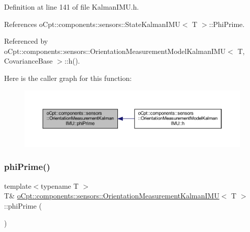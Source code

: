 Definition at line 141 of file Kalman\+I\+M\+U.\+h.



References o\+Cpt\+::components\+::sensors\+::\+State\+Kalman\+I\+M\+U$<$ T $>$\+::\+Phi\+Prime.



Referenced by o\+Cpt\+::components\+::sensors\+::\+Orientation\+Measurement\+Model\+Kalman\+I\+M\+U$<$ T, Covariance\+Base $>$\+::h().

Here is the caller graph for this function\+:
\nopagebreak
\begin{figure}[H]
\begin{center}
\leavevmode
\includegraphics[width=350pt]{classo_cpt_1_1components_1_1sensors_1_1_orientation_measurement_kalman_i_m_u_a0b5849704f6c173ed41787f9b28a57c9_icgraph}
\end{center}
\end{figure}
\hypertarget{classo_cpt_1_1components_1_1sensors_1_1_orientation_measurement_kalman_i_m_u_adcc2c27d2fa557feb5ea11e674e261f0}{}\label{classo_cpt_1_1components_1_1sensors_1_1_orientation_measurement_kalman_i_m_u_adcc2c27d2fa557feb5ea11e674e261f0} 
\subsubsection{\texorpdfstring{phi\+Prime()}{phiPrime()}\hspace{0.1cm}{\footnotesize\ttfamily [2/2]}}
{\footnotesize\ttfamily template$<$typename T $>$ \\
T\& \hyperlink{classo_cpt_1_1components_1_1sensors_1_1_orientation_measurement_kalman_i_m_u}{o\+Cpt\+::components\+::sensors\+::\+Orientation\+Measurement\+Kalman\+I\+MU}$<$ T $>$\+::phi\+Prime (\begin{DoxyParamCaption}{ }\end{DoxyParamCaption})\hspace{0.3cm}{\ttfamily [inline]}}



